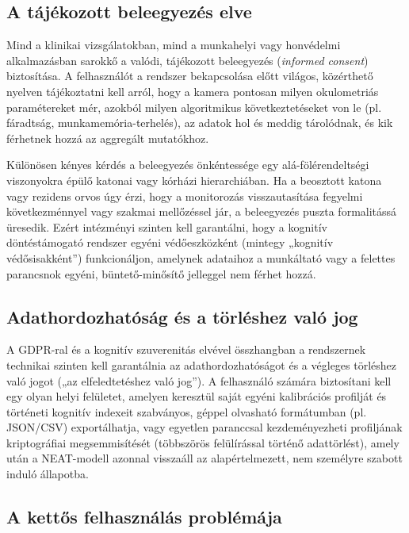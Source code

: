 \documentclass[12pt,a4paper,oneside]{book}
\begin{document}
\subsection{A tájékozott beleegyezés elve}

Mind a klinikai vizsgálatokban, mind a munkahelyi vagy honvédelmi alkalmazásban sarokkő a valódi, tájékozott beleegyezés (\emph{informed consent}) biztosítása. A felhasználót a rendszer bekapcsolása előtt világos, közérthető nyelven tájékoztatni kell arról, hogy a kamera pontosan milyen okulometriás paramétereket mér, azokból milyen algoritmikus következtetéseket von le (pl. fáradtság, munkamemória-terhelés), az adatok hol és meddig tárolódnak, és kik férhetnek hozzá az aggregált mutatókhoz.

Különösen kényes kérdés a beleegyezés önkéntessége egy alá-fölérendeltségi viszonyokra épülő katonai vagy kórházi hierarchiában. Ha a beosztott katona vagy rezidens orvos úgy érzi, hogy a monitorozás visszautasítása fegyelmi következménnyel vagy szakmai mellőzéssel jár, a beleegyezés puszta formalitássá üresedik. Ezért intézményi szinten kell garantálni, hogy a kognitív döntéstámogató rendszer egyéni védőeszközként (mintegy „kognitív védősisakként”) funkcionáljon, amelynek adataihoz a munkáltató vagy a felettes parancsnok egyéni, büntető-minősítő jelleggel nem férhet hozzá.

\subsection{Adathordozhatóság és a törléshez való jog}

A GDPR-ral és a kognitív szuverenitás elvével összhangban a rendszernek technikai szinten kell garantálnia az adathordozhatóságot és a végleges törléshez való jogot („az elfeledtetéshez való jog”). A felhasználó számára biztosítani kell egy olyan helyi felületet, amelyen keresztül saját egyéni kalibrációs profilját és történeti kognitív indexeit szabványos, géppel olvasható formátumban (pl. JSON/CSV) exportálhatja, vagy egyetlen paranccsal kezdeményezheti profiljának kriptográfiai megsemmisítését (többszörös felülírással történő adattörlést), amely után a NEAT-modell azonnal visszaáll az alapértelmezett, nem személyre szabott induló állapotba.

\subsection{A kettős felhasználás problémája}
\end{document}
